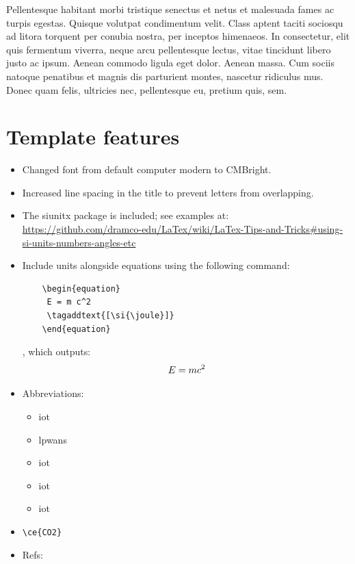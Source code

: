 Pellentesque habitant morbi tristique senectus et netus et malesuada fames ac
turpis egestas. Quisque volutpat condimentum velit. Class aptent taciti sociosqu
ad litora torquent per conubia nostra, per inceptos himenaeos. In consectetur,
elit quis fermentum viverra, neque arcu pellentesque lectus, vitae tincidunt
libero justo ac ipsum. Aenean commodo ligula eget dolor. Aenean massa. Cum
sociis natoque penatibus et magnis dis parturient montes, nascetur ridiculus mus.
Donec quam felis, ultricies nec, pellentesque eu, pretium quis, sem.

\section{Template features}

\begin{itemize}
\item Changed font from default computer modern to CMBright.
\item Increased line spacing in the title to prevent letters from overlapping.
\item The siunitx package is included; see examples at: \url{https://github.com/dramco-edu/LaTex/wiki/LaTex-Tips-and-Tricks#using-si-units-numbers-angles-etc}
\item Include units alongside equations using the following command:
\begin{lstlisting}
    \begin{equation}
     E = m c^2
     \tagaddtext{[\si{\joule}]}
    \end{equation}
    \end{lstlisting},
which outputs:
\begin{equation}\label{eq:emc2}
    E = m c^2%
    \tagaddtext{[\si{\joule}]}
\end{equation}
\item Abbreviations:
\begin{itemize}
    \item  \gls{iot}      %
    \item \glspl{lpwan}  %
    \item \acrlong{iot}  %
    \item \acrshort{iot} %
    \item \acrfull{iot}  %
\end{itemize}
\item \verb!\ce{CO2}! 
\item Refs:
\begin{itemize}


\end{itemize}
\end{itemize}
